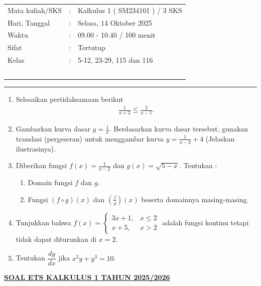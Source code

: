 \documentclass[10pt,openany,a4paper]{article}
\theoremstyle{definition}
\theoremstyle{definition}
\theoremstyle{plain}
\begin{document}
    \begin{center}
	\begin{tabular}{lcl}
		Mata kuliah/SKS & : & Kalkulus 1 ( SM234101 ) / 3 SKS\\
		Hari, Tanggal & : & Selasa, 14 Oktober 2025\\
		Waktu & : & 09.00 - 10.40 / 100 menit\\
		Sifat & : & Tertutup\\
		Kelas & : & 5-12, 23-29, 115 dan 116\\
  ~
	\end{tabular}
    
    \noindent\rule{\textwidth}{2.pt}
        \end{center}
        \begin{enumerate}
            \item Selesaikan pertidaksamaan berikut 
            \begin{align*}
                \frac{1}{x+2} \leq \frac{2}{x-1}.
            \end{align*}
            \item Gambarkan kurva dasar $y=\frac{1}{x}$. Berdasarkan kurva dasar tersebut, gunakan translasi (pergeseran) untuk menggambar kurva $y=\frac{1}{x-2}+4$ (Jelaskan ilustrasinya).
            \item Diberikan fungsi $f(x)=\frac{1}{x-2}$ dan $g(x)=\sqrt{5-x}$. Tentukan :
            \begin{enumerate}
                \item Domain fungsi $f$ dan $g$.
                \item Fungsi $(f\circ g)(x)$ dan $\left(\frac{f}{g}\right) (x)$ beserta domainnya masing-masing. 
            \end{enumerate}
            \item Tunjukkan bahwa $f(x)=\begin{cases}
                3x+1, &x\leq 2\\
                x+5, &x>2
            \end{cases}$ adalah fungsi kontinu tetapi tidak dapat diturunkan di $x=2$.
            \item Tentukan $\dfrac{dy}{dx}$ jika $x^2y+y^3=10$.
        \end{enumerate}
               \newpage
 \begin{center}
	{\underline{\textbf{\MakeUppercase{Soal ETS Kalkulus 1 Tahun 2025/2026}}}}
    \end{center}
\end{document}
